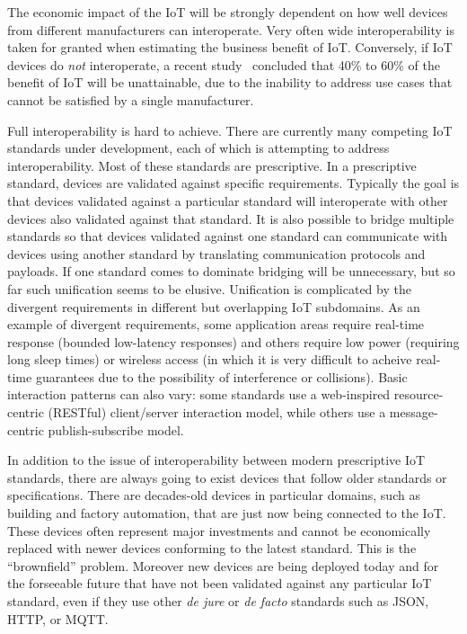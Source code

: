 The economic impact of the IoT will be strongly dependent on how well devices from 
different manufacturers can interoperate.
Very often wide interoperability is taken for granted when estimating the business
benefit of IoT. 
Conversely, if IoT devices do \emph{not} interoperate,
a recent study~\cite{McK2015a} concluded that 40\% to 60\% of the 
benefit of IoT will be unattainable,
due to the inability to address use cases that cannot be satisfied by a single manufacturer.

Full interoperability is hard to achieve.
There are currently many competing IoT standards under development,
each of which is attempting to address interoperability.
Most of these standards are prescriptive.
In a prescriptive standard,
devices are validated against specific requirements.
Typically the goal is that devices validated against 
a particular standard will interoperate with
other devices also validated against that standard.
It is also possible to bridge multiple standards so that
devices validated against one standard can communicate with
devices using another standard by translating communication protocols and payloads.
If one standard comes to dominate bridging will be unnecessary,
but so far such unification seems to be elusive. 
Unification is complicated by the
divergent requirements in different but overlapping IoT subdomains.
As an example of divergent requirements,
some application areas require real-time response (bounded low-latency responses)
and others require low power (requiring long sleep times) or wireless access
(in which it is very difficult to acheive real-time guarantees due to the
possibility of interference or collisions).
Basic interaction patterns can also vary: some standards use
a web-inspired resource-centric (RESTful) client/server interaction model,
while others use a message-centric publish-subscribe model.

In addition to the issue of interoperability between modern prescriptive IoT standards,
there are always going to exist devices that follow older standards or specifications.
There are decades-old devices in particular domains, such as building and factory
automation, that are just now being connected to the IoT.
These devices often represent major investments and cannot be economically replaced with newer
devices conforming to the latest standard.
This is the ``brownfield'' problem.
Moreover new devices are being deployed today and for the forseeable future 
that have not been validated
against any particular IoT standard,
even if they use other \textit{de jure} or \textit{de facto} standards such as JSON, HTTP, or MQTT.

